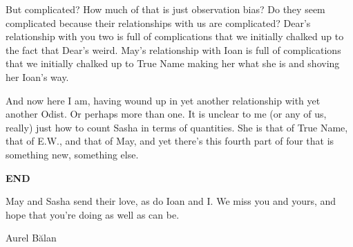 But complicated? How much of that is just observation bias? Do they seem complicated because their relationships with us are complicated? Dear's relationship with you two is full of complications that we initially chalked up to the fact that Dear's weird. May's relationship with Ioan is full of complications that we initially chalked up to True Name making her what she is and shoving her Ioan's way.

And now here I am, having wound up in yet another relationship with yet another Odist. Or perhaps more than one. It is unclear to me (or any of us, really) just how to count Sasha in terms of quantities. She is that of True Name, that of E.W., and that of May, and yet there's this fourth part of four that is something new, something else.

\textbf{END}

May and Sasha send their love, as do Ioan and I. We miss you and yours, and hope that you're doing as well as can be.

Aurel Bălan
